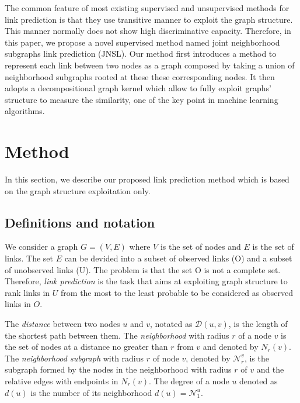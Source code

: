 \documentclass[runningheads,a4paper]{llncs}
\begin{document}
The common feature of most existing supervised and unsupervised methods for link prediction is that they use transitive manner to exploit the graph structure. This manner normally does not show high discriminative capacity. Therefore, in this paper, we propose a novel supervised method named joint neighborhood subgraphs link prediction (JNSL). Our method first introduces a method to represent each link between two nodes as a graph composed by taking a union of neighborhood subgraphs rooted at these these corresponding nodes. It then adopts a decompositional graph kernel which allow to fully exploit graphs' structure to measure the similarity, one of the key point in machine learning algorithms.

\section{Method}
In this section, we describe our proposed link prediction method which is based on the graph structure exploitation only.
\subsection{Definitions and notation}
We consider a graph $G=(V,E)$ where $V$ is the set of nodes and $E$ is the set of links. The set $E$ can be devided into a subset of observed links (O) and a subset of unobserved links (U). The problem is that the set O is not a complete set. Therefore, \textit{link prediction} is the task that aims at exploiting graph structure to rank links in $U$ from the most to the least probable to be considered as observed links in $O$.

The \textit{distance} between two nodes $u$ and $v$, notated as $\mathcal{D}(u,v)$, is the length of the shortest path between them. The \textit{neighborhood} with radius $r$ of a node $v$ is the set of nodes
at a distance no greater than $r$ from $v$ and denoted by $N_r(v)$. The \textit{neighborhood subgraph} with radius $r$ of node $v$, denoted by $\mathcal{N}_{r}^{v}$,  is the subgraph formed by the nodes in the
neighborhood with radius $r$ of $v$ and the relative edges with endpoints in $N_r(v)$. The degree of a node $u$ denoted as $d(u)$ is the number of its neighborhood $d(u) = \mathcal{N}_{1}^{u}$.
\end{document}

